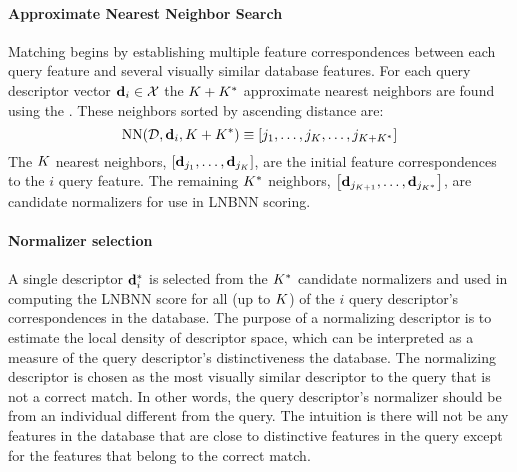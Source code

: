         \paragraph{Approximate Nearest Neighbor Search}

            Matching begins by establishing multiple feature
              correspondences between each query feature and several
              visually similar database features.
            For each query descriptor vector $\mathbf{d}_i \in \mathcal{X}$ the $K +
              K^{*}$ approximate nearest neighbors are found using the
              .
            These neighbors sorted by ascending distance are:
            \begin{equation}
                \operatorname{NN}(\mathcal{D}, \mathbf{d}_i, K + K^{*}) \equiv \left[j_1{}, \ldots{}, j_{K}, \ldots, j_{K + K^{*}}\right]
            \end{equation}
            The $K$ nearest neighbors,
              $\left[\mathbf{d}_{{j_1}}, \ldots{}, \mathbf{d}_{{j_{K}}}\right]$, are the initial feature
              correspondences to the $i$\th{} query feature.
            The remaining $K^{*}$ neighbors, $\left[\mathbf{d}_{{j_{K
              + 1}}}, \ldots{}, \mathbf{d}_{j_{K^{*}}}\right]$, are candidate normalizers for use in
              LNBNN scoring.

        \paragraph{Normalizer selection}
            A single descriptor $\mathbf{d}^{*}_{i}$ is selected from the
              $K^{*}{}$ candidate normalizers and used in computing the
              LNBNN score for all (up to $K$) of the $i$\th{} query
              descriptor's correspondences in the database.
            The purpose of a normalizing descriptor is to estimate the
              local density of descriptor space, which can be interpreted
              as a measure of the query descriptor's distinctiveness
              \wrt{} the database.
            The normalizing descriptor is chosen as the most visually
              similar descriptor to the query that is not a correct
              match.
            In other words, the query descriptor's normalizer should be
              from an individual different from the query.
            The intuition is there will not be any features in the
              database that are close to distinctive features in the
              query except for the features that belong to the correct
              match.

